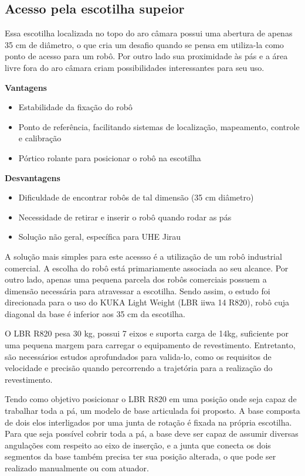 \subsection{Acesso pela escotilha supeior}
Essa escotilha localizada no topo do aro câmara possui uma abertura de apenas
35 cm de diâmetro, o que cria um desafio quando se pensa em utiliza-la como
ponto de acesso para um robô. Por outro lado sua proximidade às pás e a área livre fora do aro
câmara criam possibilidades interessantes para seu uso.

\textbf{Vantagens}
\begin{itemize}
  \item Estabilidade da fixação do robô
  \item Ponto de referência, facilitando sistemas de localização, mapeamento, controle e calibração
  \item Pórtico rolante para posicionar o robô na escotilha
\end{itemize}

\textbf{Desvantagens}
\begin{itemize}
  \item Dificuldade de encontrar robôs de tal dimensão (35 cm diâmetro)
  \item Necessidade de retirar e inserir o robô quando rodar as pás
  \item Solução não geral, específica para UHE Jirau
\end{itemize}

A solução mais simples para este acessso é a utilização de um robô industrial
comercial. A escolha do robô está primariamente associada ao seu alcance. Por outro lado, apenas
uma pequena parcela dos robôs comerciais possuem a dimensão necessária para
atravessar a escotilha. Sendo assim, o estudo foi direcionada para o uso do
KUKA Light Weight (LBR iiwa 14 R820), robô cuja diagonal da base é inferior aos
35 cm da escotilha.

O LBR R820 pesa 30 kg, possui 7 eixos e suporta carga de 14kg,
suficiente por uma pequena margem para carregar o equipamento de
revestimento. Entretanto, são necessários estudos aprofundados para valida-lo,
como os requisitos de velocidade e precisão quando percorrendo a trajetória
para a realização do revestimento.

Tendo como objetivo posicionar o LBR R820 em uma posição onde seja capaz de
trabalhar toda a pá, um modelo de base articulada foi proposto. A base
composta de dois elos interligados por uma junta de rotação é fixada na
própria escotilha. Para que seja possível cobrir toda a pá,
a base deve ser capaz de assumir diversas angulações com respeito ao
eixo de inserção, e a junta que conecta os dois segmentos da base também precisa
ter sua posição alterada, o que pode ser realizado manualmente ou com atuador.


